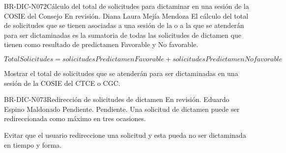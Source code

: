 \begin{BusinessRule}{BR-DIC-N072}{Cálculo del total de solicitudes para dictaminar en una sesión de la COSIE del Consejo}
	{\bcDerivation}    %
	{\btEnabler}     %
	{\blControlling}    %
	\BRItem[Estado] En revisión.
	 Diana Laura Mejía Mendoza 
	\BRItem[Descripción] El cálculo del total de solicitudes que se tienen asociadas a una sesión de la  o a la  que se atenderán para ser dictaminadas es la sumatoria de todas las solicitudes de dictamen que tienen como resultado de predictamen Favorable y No favorable.
	\BRItem[Sentencia]	\cdtEmpty
	
	$ TotalSolicitudes = solicitudesPredictamenFavorable + solicitudesPredictamenNofavorable$
	
	\BRItem[Motivacion] Mostrar el total de solicitudes que se atenderán para ser dictaminadas en una sesión de la COSIE del CTCE o CGC.
	
\end{BusinessRule}

\begin{BusinessRule}{BR-DIC-N073}{Redirección de solicitudes de dictamen}
	{\bcCondition} %
	{\btEnabler}     %
	{\blControlling}     %
	\BRItem[Estado] En revisión.
	 Eduardo Espino Maldonado
	 Pendiente.
	 Pendiente.
	\BRItem[Descripción] Una solicitud de dictamen puede ser redireccionada como máximo en tres ocasiones.
	\BRItem[Sentencia] \cdtEmpty
	
%	
	\BRItem[Motivación] Evitar que el usuario redireccione una solicitud y esta pueda no ser dictaminada en tiempo y forma.
\end{BusinessRule}

